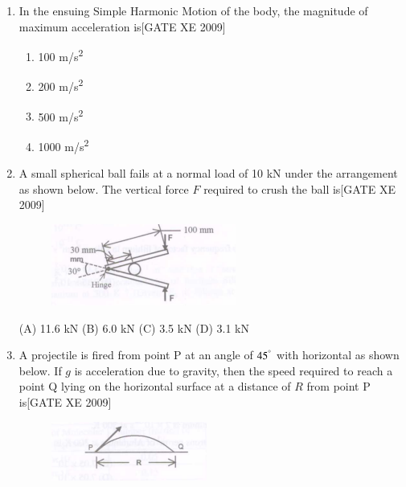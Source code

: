 \documentclass[journal,12pt,onecolumn]{IEEEtran}
\theoremstyle{remark}
\begin{document}
\begin{enumerate}
\item In the ensuing Simple Harmonic Motion of the body, the magnitude of maximum acceleration is\hfill[GATE XE 2009]
\begin{multicols}{2}
\begin{enumerate}
    \item 100 m/s\textsuperscript{2}
    \item 200 m/s\textsuperscript{2}
    \item 500 m/s\textsuperscript{2}
    \item 1000 m/s\textsuperscript{2}
\end{enumerate}
\end{multicols}




\item A small spherical ball fails at a normal load of 10 kN under the arrangement as shown below. The vertical force $F$ required to crush the ball is\hfill[GATE XE 2009]
\begin{figure}[H]
    \centering
    \includegraphics[width=0.5\linewidth]{figs/fig6.png}
    \caption*{}
    \label{fig:Q 62}
\end{figure}

    (A) 11.6 kN \hfill
    (B) 6.0 kN \hfill
   (C) 3.5 kN \hfill
   (D) 3.1 kN




\noindent
\item A projectile is fired from point P at an angle of $45^\degree$ with horizontal as shown below. If $g$ is acceleration due to gravity, then the speed required to reach a point Q lying on the horizontal surface at a distance of $R$ from point P is\hfill[GATE XE 2009]

\begin{figure}[H]
    \centering
    \includegraphics[width=0.5\linewidth]{figs/fig7.png}
    \caption*{}
    \label{fig:Q 63}
\end{figure}


\end{enumerate}
\end{document}
